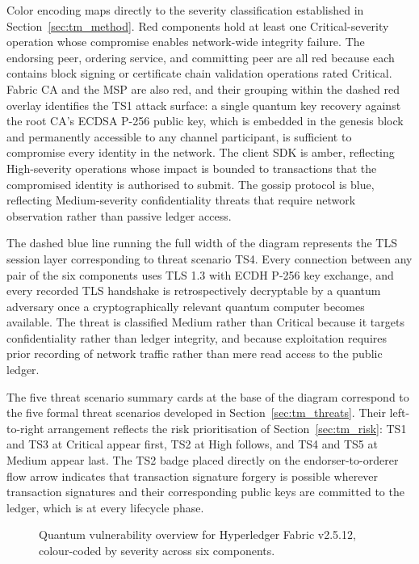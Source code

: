 \documentclass[conference]{IEEEtran}
\begin{document}
Color encoding maps directly to the severity classification established
in Section~\ref{sec:tm_method}. Red components hold at least one
Critical-severity operation whose compromise enables network-wide
integrity failure. The endorsing peer, ordering service, and committing
peer are all red because each contains block signing or certificate
chain validation operations rated Critical. Fabric CA and the MSP are
also red, and their grouping within the dashed red overlay identifies
the TS1 attack surface: a single quantum key recovery against the root
CA's ECDSA P-256 public key, which is embedded in the genesis block and
permanently accessible to any channel participant, is sufficient to
compromise every identity in the network. The client SDK is amber,
reflecting High-severity operations whose impact is bounded to
transactions that the compromised identity is authorised to submit.
The gossip protocol is blue, reflecting Medium-severity confidentiality
threats that require network observation rather than passive ledger
access.

The dashed blue line running the full width of the diagram represents
the TLS session layer corresponding to threat scenario TS4. Every
connection between any pair of the six components uses TLS 1.3 with
ECDH P-256 key exchange, and every recorded TLS handshake is
retrospectively decryptable by a quantum adversary once a
cryptographically relevant quantum computer becomes available. The
threat is classified Medium rather than Critical because it targets
confidentiality rather than ledger integrity, and because exploitation
requires prior recording of network traffic rather than mere read
access to the public ledger.

The five threat scenario summary cards at the base of the diagram
correspond to the five formal threat scenarios developed in
Section~\ref{sec:tm_threats}. Their left-to-right arrangement
reflects the risk prioritisation of Section~\ref{sec:tm_risk}: TS1
and TS3 at Critical appear first, TS2 at High follows, and TS4 and
TS5 at Medium appear last. The TS2 badge placed directly on the
endorser-to-orderer flow arrow indicates that transaction signature
forgery is possible wherever transaction signatures and their
corresponding public keys are committed to the ledger, which is at
every lifecycle phase.

\begin{figure}[ht]
\centering

\caption{Quantum vulnerability overview for Hyperledger Fabric v2.5.12, colour-coded by severity across six components.}
\label{fig:threat_model_overview}
\end{figure}
\end{document}
